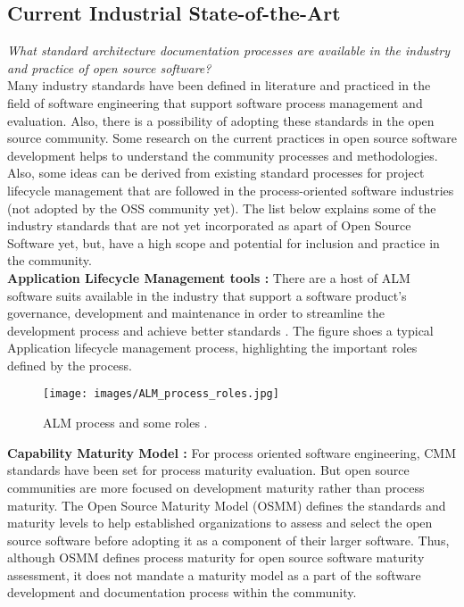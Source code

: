 \subsection{Current Industrial State-of-the-Art}
\indent \emph{What standard architecture documentation processes are available in the industry and practice of open source software?}
\\\indent Many industry standards have been defined in literature and practiced in the field of software engineering that support software process management and evaluation. Also, there is a possibility of adopting these standards in the open source community. Some research on the current practices in open source software development helps to understand the community processes and methodologies. Also, some ideas can be derived from existing standard processes for project lifecycle management that are followed in the process-oriented software industries (not adopted by the OSS community yet). The list below explains some of the industry standards that are not yet incorporated as apart of Open Source Software yet, but, have a high scope and potential for inclusion and practice in the community.
\newline
\\\indent \textbf{Application Lifecycle Management tools : }  There are a host of ALM software suits available in the industry that support a software product's governance, development and maintenance in order to streamline the development process and achieve better standards \cite{ALM2009}. The figure shoes a typical Application lifecycle management process, highlighting the important roles defined by the process.
\begin{figure}[H]
  \centering
  \texttt{[image: images/ALM\_process\_roles.jpg]}
  \caption[ALM process and roles \cite{ALM2009}]{ALM process and some roles \cite{ALM2009}.}\label{fig:ALM_process_roles}
\end{figure} 
\indent \textbf{Capability Maturity Model : }  For process oriented software engineering, CMM standards \cite{SCAMPITeam2013} have been set for process maturity evaluation. But open source communities are more focused on development maturity rather than process maturity. The Open Source Maturity Model (OSMM) \cite{Duijnhouwer2003} defines the standards and maturity levels to help established organizations to assess and select the open source software before adopting it as a component of their larger software. Thus, although OSMM defines process maturity for open source software maturity assessment, it does not mandate a maturity model as a part of the software development and documentation process within the community. 
